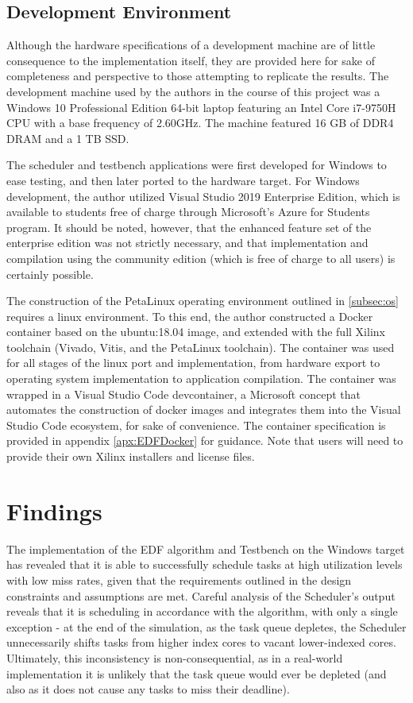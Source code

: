 \subsection{Development Environment}\label{subsec:devEnv}
Although the hardware specifications of a development machine are of little consequence to the implementation itself, they are provided here for sake of completeness and perspective to those attempting to replicate the results. The development machine used by the authors in the course of this project was a Windows 10 Professional Edition 64-bit laptop featuring an Intel Core i7-9750H CPU with a base frequency of 2.60GHz. The machine featured 16 GB of DDR4 DRAM and a 1 TB SSD.

The scheduler and testbench applications were first developed for Windows to ease testing, and then later ported to the hardware target. For Windows development, the author utilized Visual Studio 2019 Enterprise Edition, which is available to students free of charge through Microsoft's Azure for Students program. It should be noted, however, that the enhanced feature set of the enterprise edition was not strictly necessary, and that implementation and compilation using the community edition (which is free of charge to all users) is certainly possible.

The construction of the PetaLinux operating environment outlined in \ref{subsec:os} requires a linux environment. To this end, the author constructed a Docker container based on the ubuntu:18.04 image, and extended with the full Xilinx toolchain (Vivado, Vitis, and the PetaLinux toolchain). The container was used for all stages of the linux port and implementation, from hardware export to operating system implementation to application compilation. The container was wrapped in a Visual Studio Code devcontainer, a Microsoft concept that automates the construction of docker images and integrates them into the Visual Studio Code ecosystem, for sake of convenience. The container specification is provided in appendix \ref{apx:EDFDocker} for guidance. Note that users will need to provide their own Xilinx installers and license files.

\section{Findings}\label{sec:findings}
The implementation of the EDF algorithm and Testbench on the Windows target has revealed that it is able to successfully schedule tasks at high utilization levels with low miss rates, given that the requirements outlined in the design constraints and assumptions are met. Careful analysis of the Scheduler's output reveals that it is scheduling in accordance with the algorithm, with only a single exception - at the end of the simulation, as the task queue depletes, the Scheduler unnecessarily shifts tasks from higher index cores to vacant lower-indexed cores. Ultimately, this inconsistency is non-consequential, as in a real-world implementation it is unlikely that the task queue would ever be depleted (and also as it does not cause any tasks to miss their deadline).

